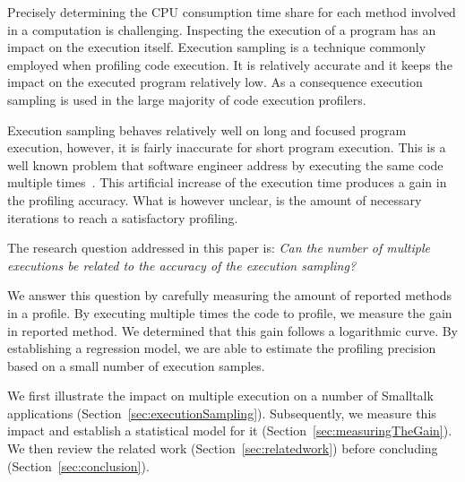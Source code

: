 \documentclass{sig-alternate}
\newcommand{\secref}[1]{Section~\ref{sec:#1}}
\begin{document}
Precisely determining the CPU consumption time share for each method involved in a computation is challenging. Inspecting the execution of a program has an impact on the execution itself. Execution sampling is a technique commonly employed when profiling code execution. It is relatively accurate and it keeps the impact on the executed program relatively low. As a consequence execution sampling is used in the large majority of code execution profilers.

Execution sampling behaves relatively well on long and focused program execution, however, it is fairly inaccurate for short program execution. This is a well known problem that software engineer address by executing the same code multiple times~\cite{Wils00a}. This artificial increase of the execution time produces a gain in the profiling accuracy. What is however unclear, is the amount of necessary iterations to reach a satisfactory profiling. 

The research question addressed in this paper is: \emph{Can the number of multiple executions be related to the accuracy of the execution sampling?}

We answer this question by carefully measuring the amount of reported methods in a profile. By executing multiple times the code to profile, we measure the gain in reported method. We determined that this gain follows a logarithmic curve. By establishing a regression model, we are able to estimate the profiling precision based on a small number of execution samples.




We first illustrate the impact on multiple execution on a number of Smalltalk applications (\secref{executionSampling}). 
Subsequently, we measure this impact and establish a statistical model for it (\secref{measuringTheGain}).
We then review the related work (\secref{relatedwork}) before concluding (\secref{conclusion}).
\end{document}
